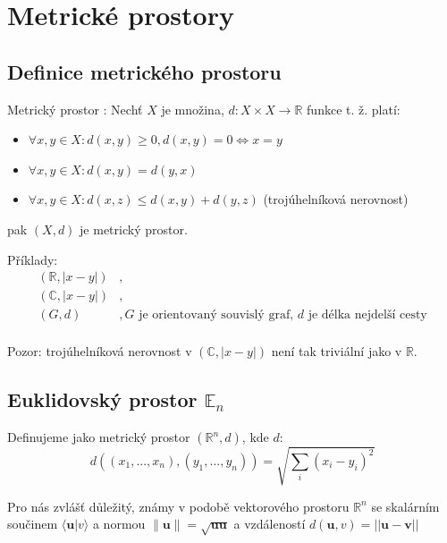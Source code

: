 \documentclass[../main.tex]{subfiles}
\begin{document}
\section{Metrické prostory}
\subsection{Definice metrického prostoru}
\hspace{1.2mm}
Metrický prostor : Nechť $X$ je množina,  $d: X \times X \rightarrow \mathbb{R}$ funkce t. ž. platí:

\begin{itemize}
\item{$\forall x,y \in X : d(x,y) \geq 0, d(x,y) = 0 \iff x = y$ }
\item{$\forall x,y \in X : d(x,y) = d(y,x)$}
\item{$\forall x,y \in X : d(x,z) \leq d(x,y) + d(y,z)$ (trojúhelníková nerovnost)}
\end{itemize}
pak $(X,d)$ je metrický prostor.

\noindent
\hspace{1.2mm}
Příklady:
\begin{align*} 
    (\mathbb{R}, |x-y|) &,\\
    (\mathbb{C},|x-y|) &,\\
    (G,d) &, G \text{ je orientovaný souvislý graf, } d \text{ je délka nejdelší cesty}\\
\end{align*}

\hspace{1.2mm}
Pozor: trojúhelníková nerovnost v $(\mathbb{C}, |x-y|)$ není tak triviální jako v $\mathbb{R}$.

\subsection{Euklidovský prostor $\mathbb{E}_n$}
\hspace{1.2mm}
Definujeme jako metrický prostor $(\mathbb{R}^n,d)$, kde $d$:
\[d((x_1,...,x_n),(y_1,...,y_n)) = \sqrt{\sum_i(x_i-y_i)^2}\]

Pro nás zvlášť důležitý, známy v podobě vektorového prostoru $\mathbb{R}^n$ se skalárním součinem $\langle \textbf{u} | v \rangle$ a normou
$\|\textbf{u}\| = \sqrt{\textbf{uu}}$ a vzdáleností $d(\textbf{u},v) = ||\textbf{u}-\textbf{v}||$
\noindent
\end{document}
